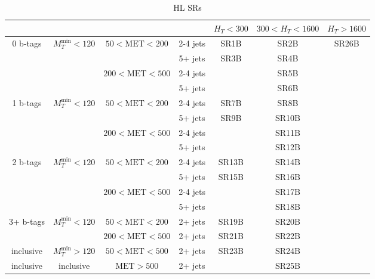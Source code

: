 \documentclass[plain,landscape]{article}
\begin{document}
\begin{table}
\renewcommand{\arraystretch}{1.3}
\centering
\begin{tabular}{|c|c|c|c|c|c|c|}
\hline
& & & & $H_T < 300$ & $300 < H_T < 1600$ & $H_T > 1600$  \\
\hline
\multirow{4}{*}{0 b-tags} &  \multirow{4}{*}{$M_T^{\textrm{min}} < 120$} & \multirow{2}{*}{$50 < \textrm{MET} < 200$} & 2-4 jets & SR1B & SR2B & \multirow{17}{*}{SR26B} \\
\cline{4-6}
& & & 5+ jets & \multirow{3}{*}{SR3B} & SR4B & \\
\cline{3-4} \cline{6-6}
& & \multirow{2}{*}{$200 < \textrm{MET} < 500$} &  2-4 jets & &  SR5B & \\
\cline{4-4} \cline{6-6}
& & & 5+ jets & & SR6B &  \\
\cline{1-6}
\multirow{4}{*}{1 b-tags} & \multirow{4}{*}{$M_T^{\textrm{min}} < 120$} & \multirow{2}{*}{ $50 < \textrm{MET} < 200$} & 2-4 jets & SR7B & SR8B & \\
\cline{4-6}
& & & 5+ jets & \multirow{3}{*}{SR9B} & SR10B & \\
\cline{3-4} \cline{6-6}
& & \multirow{2}{*}{ $200 < \textrm{MET} < 500$} &  2-4 jets & &  SR11B & \\
\cline{4-4} \cline{6-6}
& & & 5+ jets & & SR12B & \\
\cline{1-6}
\multirow{4}{*}{2 b-tags} & \multirow{4}{*}{$M_T^{\textrm{min}} < 120$} & \multirow{2}{*}{ $50 < \textrm{MET} < 200$} & 2-4 jets & SR13B &  SR14B  & \\
\cline{4-6}
& & & 5+ jets & \multirow{3}{*}{SR15B} & SR16B &  \\
\cline{3-4} \cline{6-6}
& & \multirow{2}{*}{ $200 <  \textrm{MET} < 500$} &  2-4 jets & & SR17B & \\
\cline{4-4}  \cline{6-6}
& & & 5+ jets & & SR18B & \\
\cline{1-6}
\multirow{2}{*}{3+ b-tags} & \multirow{2}{*}{$M_T^{\textrm{min}} < 120$}  & $50 < \textrm{MET} < 200$ & 2+ jets & SR19B & SR20B & \\
\cline{3-6} 
& & $200 < \textrm{MET} < 500$ & 2+ jets & SR21B & SR22B &  \\
\cline{1-6}
inclusive & $M_T^{\textrm{min}} > 120$ & $50 < \textrm{MET} < 500$  & 2+ jets & SR23B & SR24B & \\
\hline
inclusive & inclusive & $\textrm{MET} > 500$ & 2+ jets & \cellcolor{black} & \multicolumn{2}{|c|}{SR25B}  \\
\hline
\end{tabular}
\caption{HL SRs}
\end{table}
\end{document}
